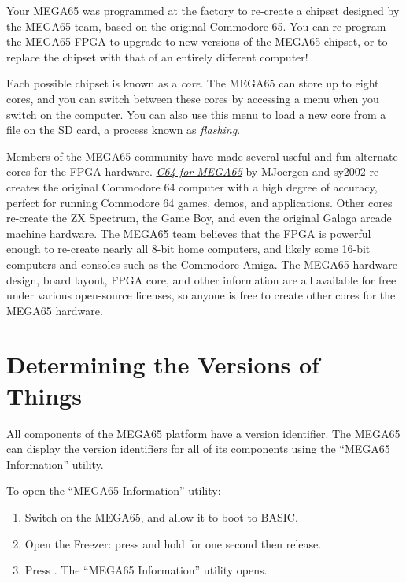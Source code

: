 Your MEGA65 was programmed at the factory to re-create a chipset designed by the MEGA65 team, based on the original Commodore 65. You can re-program the MEGA65 FPGA to upgrade to new versions of the MEGA65 chipset, or to replace the chipset with that of an entirely different computer!

Each possible chipset is known as a {\em core}. The MEGA65 can store up to eight cores, and you can switch between these cores by accessing a menu when you switch on the computer. You can also use this menu to load a new core from a file on the SD card, a process known as {\em flashing}.

Members of the MEGA65 community have made several useful and fun alternate cores for the FPGA hardware. \href{https://github.com/MJoergen/C64MEGA65}{{\em C64 for MEGA65}} by MJoergen and sy2002 re-creates the original Commodore 64 computer with a high degree of accuracy, perfect for running Commodore 64 games, demos, and applications. Other cores re-create the ZX Spectrum, the Game Boy, and even the original Galaga arcade machine hardware. The MEGA65 team believes that the FPGA is powerful enough to re-create nearly all 8-bit home computers, and likely some 16-bit computers and consoles such as the Commodore Amiga. The MEGA65 hardware design, board layout, FPGA core, and other information are all available for free under various open-source licenses, so anyone is free to
create other cores for the MEGA65 hardware.

\section{Determining the Versions of Things}
\label{sec:versions}

All components of the MEGA65 platform have a version identifier. The MEGA65 can display the version identifiers for all of its components using the ``MEGA65 Information'' utility.

To open the ``MEGA65 Information'' utility:

\begin{enumerate}
  \item Switch on the MEGA65, and allow it to boot to BASIC.
  \item Open the Freezer: press and hold  for one second then release.
  \item Press . The ``MEGA65 Information'' utility opens.
\end{enumerate}

